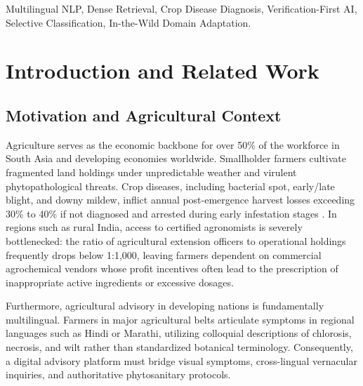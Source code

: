 \documentclass[conference]{IEEEtran}
\begin{document}
\begin{IEEEkeywords}
Multilingual NLP, Dense Retrieval, Crop Disease Diagnosis, Verification-First AI, Selective Classification, In-the-Wild Domain Adaptation.
\end{IEEEkeywords}

\section{Introduction and Related Work}
\label{sec:intro}

\subsection{Motivation and Agricultural Context}
Agriculture serves as the economic backbone for over 50\% of the workforce in South Asia and developing economies worldwide. Smallholder farmers cultivate fragmented land holdings under unpredictable weather and virulent phytopathological threats. Crop diseases, including bacterial spot, early/late blight, and downy mildew, inflict annual post-emergence harvest losses exceeding 30\% to 40\% if not diagnosed and arrested during early infestation stages \cite{singh2020plantdoc}. In regions such as rural India, access to certified agronomists is severely bottlenecked: the ratio of agricultural extension officers to operational holdings frequently drops below 1:1,000, leaving farmers dependent on commercial agrochemical vendors whose profit incentives often lead to the prescription of inappropriate active ingredients or excessive dosages. 

Furthermore, agricultural advisory in developing nations is fundamentally multilingual. Farmers in major agricultural belts articulate symptoms in regional languages such as Hindi or Marathi, utilizing colloquial descriptions of chlorosis, necrosis, and wilt rather than standardized botanical terminology. Consequently, a digital advisory platform must bridge visual symptoms, cross-lingual vernacular inquiries, and authoritative phytosanitary protocols.
\end{document}
